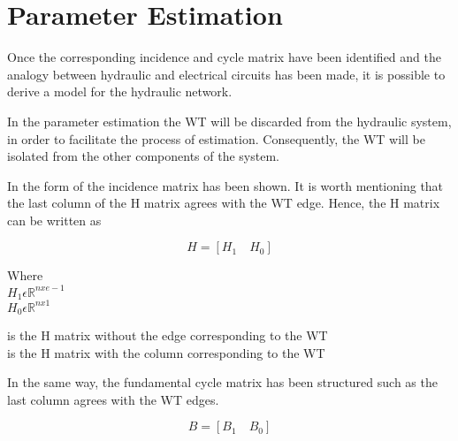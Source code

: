 \section{Parameter Estimation}  
\label{ParameterEstimation}
Once the corresponding incidence and cycle matrix have been identified and the analogy between hydraulic and
electrical circuits has been made, it is possible to derive a model for the hydraulic network. 

In the parameter estimation the WT will be discarded from the hydraulic system, 
in order to facilitate the process of estimation. Consequently, the WT will be isolated from the other components of the
system.  



In  the form of the incidence matrix has been shown. It is worth mentioning that the last column of the H matrix agrees with the WT edge. Hence, the H matrix can be written as 

\begin {equation}
H = [H_1 \quad H_0]
\label{Hmatrix}
\end{equation}

\begin{minipage}[t]{0.20\textwidth}
Where\\
\hspace*{8mm} $H_1 \epsilon \mathbb{R}^{nxe-1}$  \\
\hspace*{8mm} $H_0 \epsilon \mathbb{R}^{nx1} $ 
\end{minipage}
\begin{minipage}[t]{0.68\textwidth}
\vspace*{2mm}
\hspace*{4mm} is the H matrix without the edge corresponding to the WT\\
\hspace*{4mm} is the H matrix with the column corresponding to the WT 
\end{minipage}

In the same way, the fundamental cycle matrix has been structured such as the last column agrees with the WT edges.

\begin{equation}
  B = [B_1 \quad B_0]
\end{equation} 

